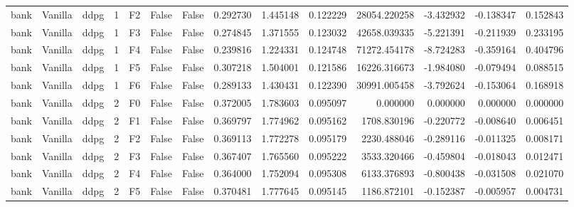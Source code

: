 \begin{tabular}{lllrlllrrrrrrr}
      bank & Vanilla &      ddpg &     1 &  F2 &           False &            False &  0.292730 &  1.445148 & 0.122229 &     28054.220258 &          -3.432932 &       -0.138347 &            0.152843 \\
      bank & Vanilla &      ddpg &     1 &  F3 &           False &            False &  0.274845 &  1.371555 & 0.123032 &     42658.039335 &          -5.221391 &       -0.211939 &            0.233195 \\
      bank & Vanilla &      ddpg &     1 &  F4 &           False &            False &  0.239816 &  1.224331 & 0.124748 &     71272.454178 &          -8.724283 &       -0.359164 &            0.404796 \\
      bank & Vanilla &      ddpg &     1 &  F5 &           False &            False &  0.307218 &  1.504001 & 0.121586 &     16226.316673 &          -1.984080 &       -0.079494 &            0.088515 \\
      bank & Vanilla &      ddpg &     1 &  F6 &           False &            False &  0.289133 &  1.430431 & 0.122390 &     30991.005458 &          -3.792624 &       -0.153064 &            0.168918 \\
      bank & Vanilla &      ddpg &     2 &  F0 &           False &            False &  0.372005 &  1.783603 & 0.095097 &         0.000000 &           0.000000 &        0.000000 &            0.000000 \\
      bank & Vanilla &      ddpg &     2 &  F1 &           False &            False &  0.369797 &  1.774962 & 0.095162 &      1708.830196 &          -0.220772 &       -0.008640 &            0.006451 \\
      bank & Vanilla &      ddpg &     2 &  F2 &           False &            False &  0.369113 &  1.772278 & 0.095179 &      2230.488046 &          -0.289116 &       -0.011325 &            0.008171 \\
      bank & Vanilla &      ddpg &     2 &  F3 &           False &            False &  0.367407 &  1.765560 & 0.095222 &      3533.320466 &          -0.459804 &       -0.018043 &            0.012471 \\
      bank & Vanilla &      ddpg &     2 &  F4 &           False &            False &  0.364000 &  1.752094 & 0.095308 &      6133.376893 &          -0.800438 &       -0.031508 &            0.021070 \\
      bank & Vanilla &      ddpg &     2 &  F5 &           False &            False &  0.370481 &  1.777645 & 0.095145 &      1186.872101 &          -0.152387 &       -0.005957 &            0.004731 \\

\end{tabular}
